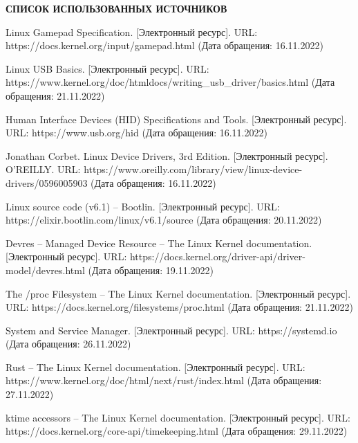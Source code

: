 \begin{center}
	{\bfseries\large СПИСОК ИСПОЛЬЗОВАННЫХ ИСТОЧНИКОВ}
\end{center}

\begingroup
\renewcommand{\section}[2]{}
\begin{thebibliography}{}
	 Linux Gamepad Specification. [Электронный ресурс]. URL: https://docs.kernel.org/input/gamepad.html (Дата обращения: 16.11.2022)

	 Linux USB Basics. [Электронный ресурс]. URL: https://www.kernel.org/doc/htmldocs/writing\_usb\_driver/basics.html (Дата обращения: 21.11.2022)

	 Human Interface Devices (HID) Specifications and Tools. [Электронный ресурс]. URL: https://www.usb.org/hid (Дата обращения: 16.11.2022)

	 Jonathan Corbet. Linux Device Drivers, 3rd Edition. [Электронный ресурс]. O'REILLY. URL: https://www.oreilly.com/library/view/linux-device-drivers/0596005903 (Дата обращения: 16.11.2022)

	 Linux source code (v6.1) -- Bootlin. [Электронный ресурс]. URL: https://elixir.bootlin.com/linux/v6.1/source (Дата обращения: 20.11.2022)

	 Devres -- Managed Device Resource -- The Linux Kernel  documentation. [Электронный ресурс]. URL: https://docs.kernel.org/driver-api/driver-model/devres.html (Дата обращения: 19.11.2022)

	 The /proc Filesystem -- The Linux Kernel documentation. [Электронный ресурс]. URL: https://docs.kernel.org/filesystems/proc.html (Дата обращения: 21.11.2022)

	 System and Service Manager. [Электронный ресурс]. URL: https://systemd.io (Дата обращения: 26.11.2022)

	 Rust -- The Linux Kernel documentation. [Электронный ресурс]. URL: https://www.kernel.org/doc/html/next/rust/index.html (Дата обращения: 27.11.2022)

	 ktime accessors -- The Linux Kernel documentation.  [Электронный ресурс]. URL: https://docs.kernel.org/core-api/timekeeping.html (Дата обращения: 29.11.2022)
\end{thebibliography}
\endgroup

\pagebreak
